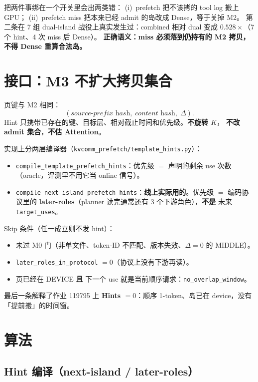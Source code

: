 \documentclass[UTF8,a4paper,11pt,fontset=fandol]{ctexart}
\begin{document}
把两件事绑在一个开关里会出两类错：
(i)~prefetch 把不该拷的 tool log 搬上 GPU；
(ii)~prefetch miss 把本来已经 admit 的岛改成 Dense，等于关掉 M2。
第二条在 7 组 dual-island 战役上真实发生过：combined 相对 dual 变成 $0.528\times$（7 个 hint、4 次 miss 后 Dense）。
\textbf{正确语义：miss 必须落到仍持有的 M2 拷贝，不得 Dense 重算合法岛。}

\section{接口：M3 不扩大拷贝集合}

页键与 M2 相同：
\[
(\textit{source-prefix hash},\; \textit{content hash},\; \Delta).
\]
Hint 只携带已存在的键、目标层、相对截止时间和优先级。\textbf{不旋转 $K$}，
\textbf{不改 admit 集合}，\textbf{不估 Attention}。

实现上分两层编译器（\texttt{kvcomm\_prefetch/template\_hints.py}）：

\begin{itemize}
  \item \texttt{compile\_template\_prefetch\_hints}：优先级 $=$ 声明的剩余 use 次数（oracle，评测里不用它当 online 信号）。
  \item \texttt{compile\_next\_island\_prefetch\_hints}：\textbf{线上实际用的}。优先级 $=$ 编码协议里的 \textbf{later-roles}（planner 读完通常还有 3 个下游角色），\textbf{不是} 未来 \texttt{target\_uses}。
\end{itemize}

Skip 条件（任一成立则不发 hint）：

\begin{itemize}
  \item 未过 M0 门（非单文件、token-ID 不匹配、版本失效、$\Delta=0$ 的 MIDDLE）。
  \item \texttt{later\_roles\_in\_protocol} $=0$（协议上没有下游再读）。
  \item 页已经在 DEVICE \textbf{且} 下一个 use 就是当前顺序请求：\texttt{no\_overlap\_window}。
\end{itemize}

最后一条解释了作业 119795 上 \textbf{Hints $=0$}：顺序 1-token、岛已在 device，没有「提前搬」的时间窗。

\section{算法}

\subsection{Hint 编译（next-island / later-roles）}
\end{document}
